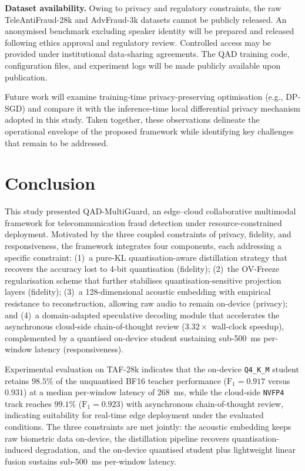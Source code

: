 \documentclass[a4paper,fleqn]{cas-sc}
\begin{document}
\textbf{Dataset availability.}
Owing to privacy and regulatory constraints, the raw TeleAntiFraud-28k and AdvFraud-3k datasets cannot be publicly released. An anonymised benchmark excluding speaker identity will be prepared and released following ethics approval and regulatory review. Controlled access may be provided under institutional data-sharing agreements. The QAD training code, configuration files, and experiment logs will be made publicly available upon publication.

Future work will examine training-time privacy-preserving optimisation (e.g., DP-SGD) and compare it with the inference-time local differential privacy mechanism adopted in this study. Taken together, these observations delineate the operational envelope of the proposed framework while identifying key challenges that remain to be addressed.

\section{Conclusion}\label{sec:conclusion}

This study presented QAD-MultiGuard, an edge--cloud collaborative multimodal framework for telecommunication fraud detection under resource-constrained deployment. Motivated by the three coupled constraints of privacy, fidelity, and responsiveness, the framework integrates four components, each addressing a specific constraint: (1)~a pure-KL quantisation-aware distillation strategy that recovers the accuracy lost to 4-bit quantisation (fidelity); (2)~the OV-Freeze regularisation scheme that further stabilises quantisation-sensitive projection layers (fidelity); (3)~a 128-dimensional acoustic embedding with empirical resistance to reconstruction, allowing raw audio to remain on-device (privacy); and (4)~a domain-adapted speculative decoding module that accelerates the asynchronous cloud-side chain-of-thought review ($3.32\times$ wall-clock speedup), complemented by a quantised on-device student sustaining sub-500~ms per-window latency (responsiveness).

Experimental evaluation on TAF-28k indicates that the on-device \texttt{Q4\_K\_M} student retains $98.5\%$ of the unquantised BF16 teacher performance ($\text{F}_1 = 0.917$ versus $0.931$) at a median per-window latency of 268~ms, while the cloud-side \texttt{NVFP4} track reaches $99.1\%$ ($\text{F}_1 = 0.923$) with asynchronous chain-of-thought review, indicating suitability for real-time edge deployment under the evaluated conditions. The three constraints are met jointly: the acoustic embedding keeps raw biometric data on-device, the distillation pipeline recovers quantisation-induced degradation, and the on-device quantised student plus lightweight linear fusion sustains sub-500~ms per-window latency.
\end{document}
